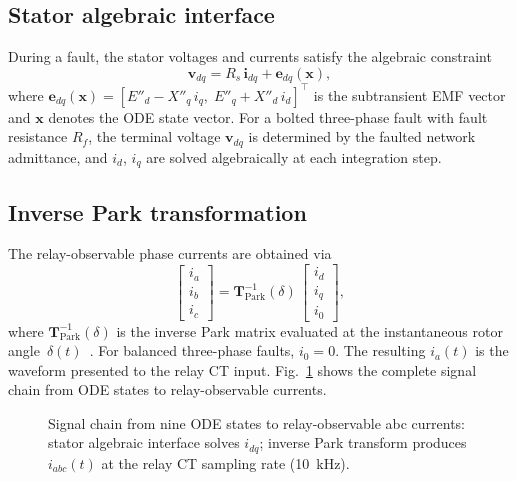\documentclass[journal,twoside,letterpaper]{IEEEtran}
\newcommand{\vect}[1]{\bm{#1}}
\begin{document}
\subsection{Stator algebraic interface}

During a fault, the stator voltages and currents satisfy the
algebraic constraint
\begin{equation}
  \vect{v}_{dq} = R_s\,\vect{i}_{dq} + \vect{e}_{dq}(\vect{x}),
\label{eq:stator}
\end{equation}
where $\vect{e}_{dq}(\vect{x}) = [E''_d - X''_q\,i_q,\;
E''_q + X''_d\,i_d]^\top$ is the subtransient EMF vector and
$\vect{x}$ denotes the ODE state vector.
For a bolted three-phase fault with fault resistance $R_f$,
the terminal voltage $\vect{v}_{dq}$ is determined by the
faulted network admittance, and $i_d$, $i_q$ are solved
algebraically at each integration step.

\subsection{Inverse Park transformation}

The relay-observable phase currents are obtained via
\begin{equation}
  \begin{bmatrix}i_a \\ i_b \\ i_c\end{bmatrix}
  = \vect{T}_{\mathrm{Park}}^{-1}(\delta)\,
  \begin{bmatrix}i_d \\ i_q \\ i_0\end{bmatrix},
\label{eq:park_inv}
\end{equation}
where $\vect{T}_{\mathrm{Park}}^{-1}(\delta)$ is the
inverse Park matrix evaluated at the instantaneous rotor
angle~$\delta(t)$~\cite{Kundur1994}.
For balanced three-phase faults, $i_0 = 0$.
The resulting $i_a(t)$ is the waveform presented to the
relay CT input.
Fig.~\ref{fig:dq_to_abc} shows the complete signal chain from
ODE states to relay-observable currents.

\begin{figure}[!t]
  \centering
  
  \caption{Signal chain from nine ODE states to
    relay-observable abc currents: stator algebraic
    interface solves $i_{dq}$; inverse Park transform
    produces $i_{abc}(t)$ at the relay CT sampling rate
    (10~kHz).}
  \label{fig:dq_to_abc}
\end{figure}
\end{document}
